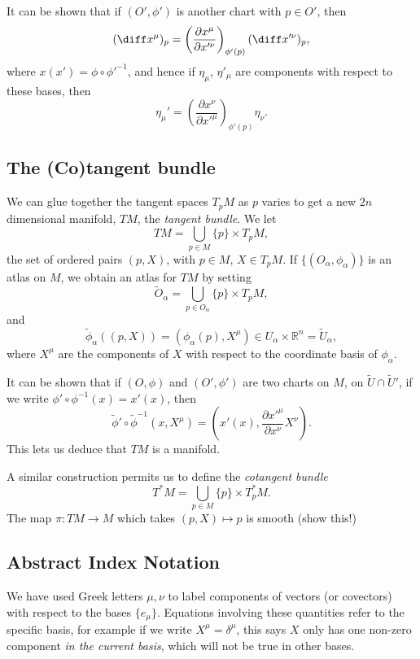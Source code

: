 \documentclass[12pt]{article}
\begin{document}
It can be shown that if $(O', \phi')$ is another chart with $p \in O'$, then
\[
	(\diff x^\mu)_p = \left( \frac{\partial x^\mu}{\partial x'^\nu} \right)_{\phi'(p)} (\diff x'^\nu)_p,
\]
where $x(x') = \phi \circ \phi'^{-1}$, and hence if $\eta_\mu$, $\eta'_\mu$ are components with respect to these bases, then
\[
\eta_\mu' = \left(\frac{\partial x^\nu}{\partial x'^\mu} \right)_{\phi'(p)} \eta_\nu.
\]

\subsection{The (Co)tangent bundle}%
\label{sub:tb}

We can glue together the tangent spaces $T_pM$ as $p$ varies to get a new $2n$ dimensional manifold, $TM$, the \emph{tangent bundle}. We let
\[
	TM = \bigcup_{p \in M} \{p\} \times T_pM,
\]
the set of ordered pairs $(p, X)$, with $p \in M$, $X \in T_pM$. If $\{(O_\alpha, \phi_\alpha)\}$ is an atlas on $M$, we obtain an atlas for $TM$ by setting
\[
	\tilde O_\alpha = \bigcup_{p \in O_\alpha} \{p\} \times T_p M,
\]
and
\[
\tilde \phi_\alpha((p, X)) = (\phi_\alpha(p), X^\mu) \in U_\alpha \times \mathbb{R}^{n} = \tilde U_\alpha,
\]
where $X^\mu$ are the components of $X$ with respect to the coordinate basis of $\phi_\alpha$.

It can be shown that if $(O, \phi)$ and $(O', \phi')$ are two charts on $M$, on $\tilde U \cap \tilde U'$, if we write $\phi' \circ \phi^{-1}(x) = x'(x)$, then
\[
\tilde \phi' \circ \tilde \phi^{-1}(x, X^\mu) = \left( x'(x), \frac{\partial x'^\mu}{\partial x^\nu} X^\nu \right).
\]
This lets us deduce that $TM$ is a manifold.

A similar construction permits us to define the \emph{cotangent bundle}
\[
	T^\ast M = \bigcup_{p \in M} \{p\} \times T_p^\ast M.
\]
The map $\pi : TM \to M$ which takes $(p, X) \mapsto p$ is smooth (show this!)

\subsection{Abstract Index Notation}%
\label{sub:ain}

We have used Greek letters $\mu, \nu$ to label components of vectors (or covectors) with respect to the bases $\{e_\mu\}$. Equations involving these quantities refer to the specific basis, for example if we write $X^\mu = \delta^\mu$, this says $X$ only has one non-zero component \emph{in the current basis}, which will not be true in other bases.
\end{document}
